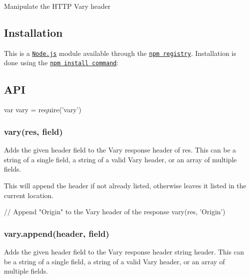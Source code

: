 \href{https://npmjs.org/package/vary}{\tt } \href{https://npmjs.org/package/vary}{\tt } \href{https://nodejs.org/en/download}{\tt } \href{https://travis-ci.org/jshttp/vary}{\tt } \href{https://coveralls.io/r/jshttp/vary}{\tt }

Manipulate the H\+T\+TP Vary header

\subsection*{Installation}

This is a \href{https://nodejs.org/en/}{\tt Node.\+js} module available through the \href{https://www.npmjs.com/}{\tt npm registry}. Installation is done using the \href{https://docs.npmjs.com/getting-started/installing-npm-packages-locally}{\tt {\ttfamily npm install} command}\+:




\subsection*{A\+PI}


\begin{DoxyCode}
var vary = require('vary')
\end{DoxyCode}


\subsubsection*{vary(res, field)}

Adds the given header {\ttfamily field} to the {\ttfamily Vary} response header of {\ttfamily res}. This can be a string of a single field, a string of a valid {\ttfamily Vary} header, or an array of multiple fields.

This will append the header if not already listed, otherwise leaves it listed in the current location.


\begin{DoxyCode}
// Append "Origin" to the Vary header of the response
vary(res, 'Origin')
\end{DoxyCode}


\subsubsection*{vary.\+append(header, field)}

Adds the given header {\ttfamily field} to the {\ttfamily Vary} response header string {\ttfamily header}. This can be a string of a single field, a string of a valid {\ttfamily Vary} header, or an array of multiple fields.

